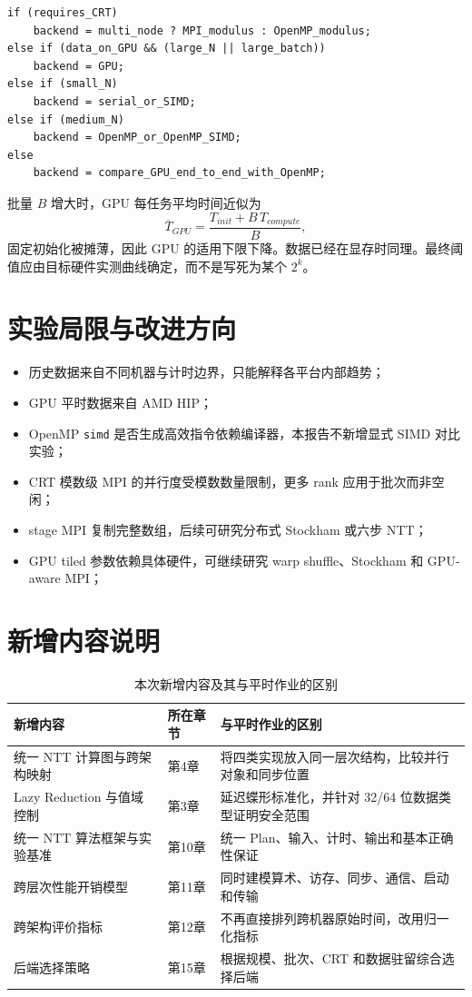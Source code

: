 \begin{lstlisting}[title=后端选择的分析性决策流程]
if (requires_CRT)
    backend = multi_node ? MPI_modulus : OpenMP_modulus;
else if (data_on_GPU && (large_N || large_batch))
    backend = GPU;
else if (small_N)
    backend = serial_or_SIMD;
else if (medium_N)
    backend = OpenMP_or_OpenMP_SIMD;
else
    backend = compare_GPU_end_to_end_with_OpenMP;
\end{lstlisting}

批量 $B$ 增大时，GPU 每任务平均时间近似为
\[
\overline{T}_{GPU}
=\frac{T_{init}+B\,T_{compute}}B,
\]
固定初始化被摊薄，因此 GPU 的适用下限下降。数据已经在显存时同理。最终阈值应由目标硬件实测曲线确定，而不是写死为某个 $2^k$。

\section{实验局限与改进方向}

\begin{itemize}
  \item 历史数据来自不同机器与计时边界，只能解释各平台内部趋势；
  \item GPU 平时数据来自 AMD HIP；
  \item OpenMP \texttt{simd} 是否生成高效指令依赖编译器，本报告不新增显式 SIMD 对比实验；
  \item CRT 模数级 MPI 的并行度受模数数量限制，更多 rank 应用于批次而非空闲；
  \item stage MPI 复制完整数组，后续可研究分布式 Stockham 或六步 NTT；
  \item GPU tiled 参数依赖具体硬件，可继续研究 warp shuffle、Stockham 和 GPU-aware MPI；
\end{itemize}

\section{新增内容说明}

\begin{table}[H]
  \centering
  \caption{本次新增内容及其与平时作业的区别}
  \label{tab:new-content}
  \small
  \begin{tabularx}{\textwidth}{p{3.6cm} p{2.4cm} X}
    \toprule
    新增内容 & 所在章节 & 与平时作业的区别 \\
    \midrule
    统一 NTT 计算图与跨架构映射 & 第4章 & 将四类实现放入同一层次结构，比较并行对象和同步位置 \\
    Lazy Reduction 与值域控制 & 第3章 & 延迟蝶形标准化，并针对 32/64 位数据类型证明安全范围 \\
    统一 NTT 算法框架与实验基准 & 第10章 & 统一 Plan、输入、计时、输出和基本正确性保证 \\
    跨层次性能开销模型 & 第11章 & 同时建模算术、访存、同步、通信、启动和传输 \\
    跨架构评价指标 & 第12章 & 不再直接排列跨机器原始时间，改用归一化指标 \\
    后端选择策略 & 第15章 & 根据规模、批次、CRT 和数据驻留综合选择后端 \\
    \bottomrule
  \end{tabularx}
\end{table}


